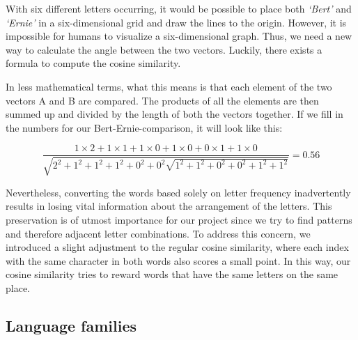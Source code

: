 \begin{samepage}
\noindent With six different letters occurring, it would be possible to place both \textit{‘Bert’} and \textit{‘Ernie’} in a six-dimensional grid and draw the lines to the origin. However, it is impossible for humans to visualize a six-dimensional graph. Thus, we need a new way to calculate the angle between the two vectors. Luckily, there exists a formula to compute the cosine similarity. 

\begin{center}

\end{center}
\end{samepage}


In less mathematical terms, what this means is that each element of the two vectors A and B are compared. The products of all the elements are then summed up and divided by the length of both the vectors together. If we fill in the numbers for our Bert-Ernie-comparison, it will look like this: 

\begin{equation}
	\frac{1 \times 2 + 1 \times 1 + 1 \times 0 + 1 \times 0 + 0 \times 1 + 1 \times 0}{\sqrt{2^2 + 1^2 + 1^2 + 1^2 + 0^2 + 0^2 \sqrt{1^2 + 1^2 + 0^2 + 0^2 + 1^2 + 1^2}}} = 0.56
\end{equation}

Nevertheless, converting the words based solely on letter frequency inadvertently results in losing vital information about the arrangement of the letters. This preservation is of utmost importance for our project since we try to find patterns and therefore adjacent letter combinations. To address this concern, we introduced a slight adjustment to the regular cosine similarity, where each index with the same character in both words also scores a small point. In this way, our cosine similarity tries to reward words that have the same letters on the same place.

\subsection{Language families}

